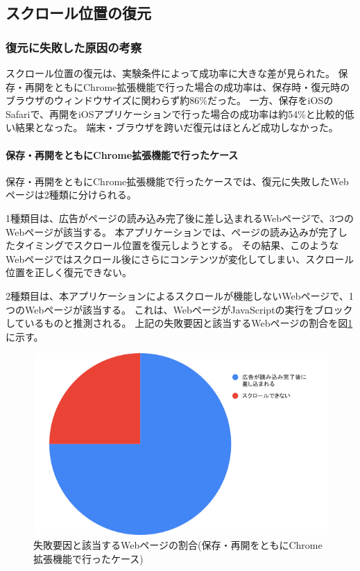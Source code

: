 \subsection{スクロール位置の復元}

\subsubsection{復元に失敗した原因の考察}
スクロール位置の復元は、実験条件によって成功率に大きな差が見られた。
保存・再開をともにChrome拡張機能で行った場合の成功率は、保存時・復元時のブラウザのウィンドウサイズに関わらず約86\%だった。
一方、保存をiOSのSafariで、再開をiOSアプリケーションで行った場合の成功率は約54\%と比較的低い結果となった。
端末・ブラウザを跨いだ復元はほとんど成功しなかった。

\paragraph{保存・再開をともにChrome拡張機能で行ったケース}

保存・再開をともにChrome拡張機能で行ったケースでは、復元に失敗したWebページは2種類に分けられる。

1種類目は、広告がページの読み込み完了後に差し込まれるWebページで、3つのWebページが該当する。
本アプリケーションでは、ページの読み込みが完了したタイミングでスクロール位置を復元しようとする。
その結果、このようなWebページではスクロール後にさらにコンテンツが変化してしまい、スクロール位置を正しく復元できない。

2種類目は、本アプリケーションによるスクロールが機能しないWebページで、1つのWebページが該当する。
これは、WebページがJavaScriptの実行をブロックしているものと推測される。
上記の失敗要因と該当するWebページの割合を図\ref{fig:evl-consideration-scroll-position-cause-ratio-chrome}に示す。

\begin{figure}[htbp]
  \caption{失敗要因と該当するWebページの割合(保存・再開をともにChrome拡張機能で行ったケース)}
  \label{fig:evl-consideration-scroll-position-cause-ratio-chrome}
  \begin{center}
    \includegraphics[bb=0 0 600 371,width=15cm]{img/060_evaluation/consideration/scroll_position/cause-ratio-chrome.pdf}
  \end{center}
\end{figure}

